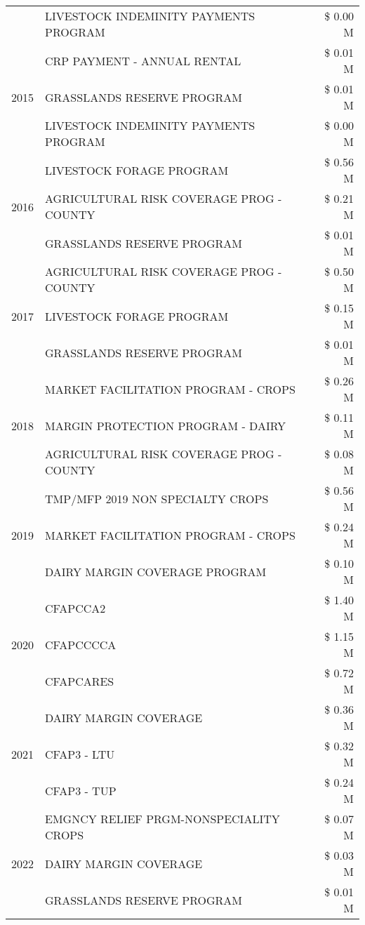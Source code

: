 \begin{tabular}{llr}
 & LIVESTOCK INDEMINITY PAYMENTS PROGRAM & \$ 0.00 M \\
\cline{1-3}
\multirow[t]{3}{*}{2015} & CRP PAYMENT - ANNUAL RENTAL & \$ 0.01 M \\
 & GRASSLANDS RESERVE PROGRAM & \$ 0.01 M \\
 & LIVESTOCK INDEMINITY PAYMENTS PROGRAM & \$ 0.00 M \\
\cline{1-3}
\multirow[t]{3}{*}{2016} & LIVESTOCK FORAGE PROGRAM & \$ 0.56 M \\
 & AGRICULTURAL RISK COVERAGE PROG - COUNTY & \$ 0.21 M \\
 & GRASSLANDS RESERVE PROGRAM & \$ 0.01 M \\
\cline{1-3}
\multirow[t]{3}{*}{2017} & AGRICULTURAL RISK COVERAGE PROG - COUNTY & \$ 0.50 M \\
 & LIVESTOCK FORAGE PROGRAM & \$ 0.15 M \\
 & GRASSLANDS RESERVE PROGRAM & \$ 0.01 M \\
\cline{1-3}
\multirow[t]{3}{*}{2018} & MARKET FACILITATION PROGRAM - CROPS & \$ 0.26 M \\
 & MARGIN PROTECTION PROGRAM - DAIRY & \$ 0.11 M \\
 & AGRICULTURAL RISK COVERAGE PROG - COUNTY & \$ 0.08 M \\
\cline{1-3}
\multirow[t]{3}{*}{2019} & TMP/MFP 2019 NON SPECIALTY CROPS & \$ 0.56 M \\
 & MARKET FACILITATION PROGRAM - CROPS & \$ 0.24 M \\
 & DAIRY MARGIN COVERAGE PROGRAM & \$ 0.10 M \\
\cline{1-3}
\multirow[t]{3}{*}{2020} & CFAPCCA2 & \$ 1.40 M \\
 & CFAPCCCCA & \$ 1.15 M \\
 & CFAPCARES & \$ 0.72 M \\
\cline{1-3}
\multirow[t]{3}{*}{2021} & DAIRY MARGIN COVERAGE & \$ 0.36 M \\
 & CFAP3 - LTU & \$ 0.32 M \\
 & CFAP3 - TUP & \$ 0.24 M \\
\cline{1-3}
\multirow[t]{3}{*}{2022} & EMGNCY RELIEF PRGM-NONSPECIALITY CROPS & \$ 0.07 M \\
 & DAIRY MARGIN COVERAGE & \$ 0.03 M \\
 & GRASSLANDS RESERVE PROGRAM & \$ 0.01 M \\
\cline{1-3}
\bottomrule
\end{tabular}
